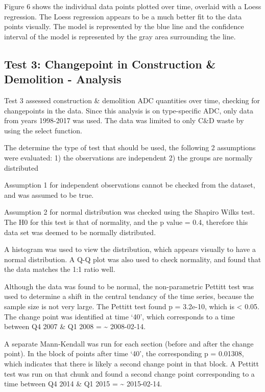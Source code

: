 \documentclass[12pt,]{article}
\begin{document}
Figure 6 shows the individual data points plotted over time, overlaid
with a Loess regression. The Loess regression appears to be a much
better fit to the data points visually. The model is represented by the
blue line and the confidence interval of the model is represented by the
gray area surrounding the line.

\subsection{Test 3: Changepoint in Construction \& Demolition -
Analysis}\label{test-3-changepoint-in-construction-demolition---analysis}

Test 3 assessed construction \& demolition ADC quantities over time,
checking for changepoints in the data. Since this analysis is on
type-specific ADC, only data from years 1998-2017 was used. The data was
limited to only C\&D waste by using the select function.

The determine the type of test that should be used, the following 2
assumptions were evaluated: 1) the observations are independent 2) the
groups are normally distributed

Assumption 1 for independent observations cannot be checked from the
dataset, and was assumed to be true.

Assumption 2 for normal distribution was checked using the Shapiro Wilks
test. The H0 for this test is that of normality, and the p value = 0.4,
therefore this data set was deemed to be normally distributed.

A histogram was used to view the distribution, which appears visually to
have a normal distribution. A Q-Q plot was also used to check normality,
and found that the data matches the 1:1 ratio well.

Although the data was found to be normal, the non-parametric Pettitt
test was used to determine a shift in the central tendancy of the time
series, because the sample size is not very large. The Pettitt test
found p = 3.2e-10, which is \textless{} 0.05. The change point was
identified at time `40', which corresponds to a time between Q4 2007 \&
Q1 2008 = \textasciitilde{} 2008-02-14.

A separate Mann-Kendall was run for each section (before and after the
change point). In the block of points after time `40', the corresponding
p = 0.01308, which indicates that there is likely a second change point
in that block. A Pettitt test was run on that chunk and found a second
change point corresponding to a time between Q4 2014 \& Q1 2015 =
\textasciitilde{} 2015-02-14.
\end{document}
